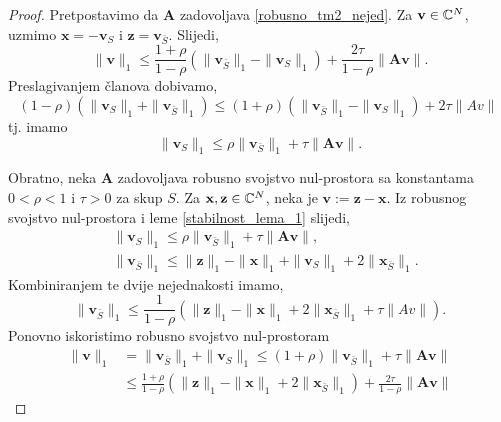 \documentclass[a4paper,twoside,12pt]{memoir} %
\newcommand{\vect}[1]{\mathbf{#1}}
\renewcommand{\vec}{\vect}
\newcommand{\norm}[1]{\|{#1}\|}
\begin{document}
\begin{proof}
    Pretpostavimo da $\vec A$ zadovoljava \eqref{robusno_tm2_nejed}. Za $\vec v \in \C^N$, uzmimo $\vec x = - \vec v_S$ i $\vec z = \vec v_{\bar S}$. Slijedi,
    \begin{equation*}
        \norm{\vec v}_1 \leq \frac{1+\rho}{1- \rho}(\norm{\vec v_{\bar S}}_1 - \norm{\vec v_S}_1) + \frac{2 \tau}{1 - \rho} \norm{\vec{Av}}.
    \end{equation*}
    Preslagivanjem \v{c}lanova dobivamo,
    \begin{equation*}
        (1-\rho)(\norm{\vec v_S}_1 + \norm{\vec v_{\bar S}}_1) \leq (1 + \rho)(\norm{\vec v_{\bar S}}_1 - \norm{\vec v_S}_1) + 2 \tau \norm{Av}\
    \end{equation*}
    tj. imamo
    \begin{equation*}
        \norm{\vec v_S}_1 \leq \rho \norm{\vec v_{\bar S}}_1 + \tau \norm{\vec{Av}}.
    \end{equation*} 

    \indent Obratno, neka $\vec A$ zadovoljava robusno svojstvo nul-prostora sa konstantama $0<\rho<1$ i $\tau > 0$ za skup $S$. Za $\vec x, \vec z \in \C^N$, neka je $\vec v := \vec z - \vec x$. Iz robusnog svojstvo nul-prostora i leme \ref{stabilnost_lema_1} slijedi,
   \begin{align*}
       &\norm{\vec v_S}_1 \leq \rho \norm{\vec v_{\bar S}}_1 + \tau \norm{\vec{Av}},\\
       &\norm{\vec v_{\bar S}}_1 \leq \norm{\vec z}_1 - \norm{\vec x}_1 + \norm{\vec v_S}_1 + 2 \norm{\vec x_{\bar S}}_1.
   \end{align*} 
   Kombiniranjem te dvije nejednakosti imamo,
   \begin{equation*}
       \norm{\vec v_{\bar S}}_1 \leq \frac{1}{1-\rho}(\norm{\vec z}_1 - \norm{\vec x}_1 + 2 \norm{\vec x_{\bar S}}_1 + \tau \norm{Av}). 
   \end{equation*}
   Ponovno iskoristimo robusno svojstvo nul-prostoram
   \begin{align*}
       \norm{\vec v}_1 &= \norm{\vec v_{\bar S}}_1 + \norm{\vec v_S}_1 \leq (1 + \rho)\norm{\vec v_{\bar S}}_1 + \tau \norm{\vec{Av}}\\
       & \leq \frac{1+\rho}{1-\rho}(\norm{\vec z}_1 - \norm{\vec x}_1 + 2 \norm{\vec x_{\bar S}}_1) + \frac{2 \tau}{1-\rho}  \norm{\vec{Av}}
   \end{align*}
\end{proof}
\end{document}
